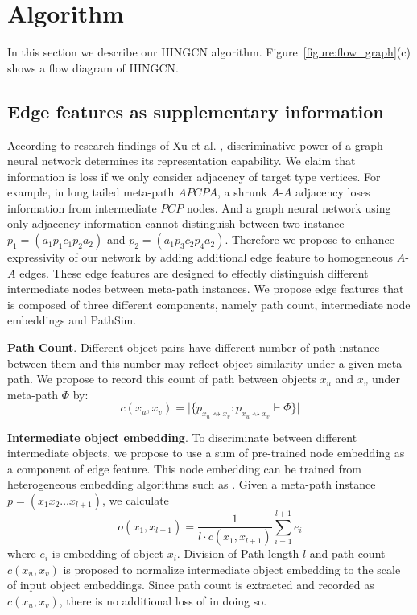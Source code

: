 \section{Algorithm}
\label{sec:algorithm}

In this section we describe our HINGCN algorithm. Figure~\ref{figure:flow_graph}(c) shows a flow diagram of HINGCN. 

\subsection{Edge features as supplementary information}
\label{sec:edge}
According to research findings of Xu et al. \cite{XuHLJ19}, discriminative power of a graph neural network determines its representation capability.
We claim that information is loss if we only consider adjacency of target type vertices. 
For example, in long tailed meta-path $APCPA$, a shrunk $A$-$A$ adjacency loses information from intermediate $PCP$ nodes. And a graph neural network using only adjacency information cannot distinguish between two instance $p_1 = (a_1 p_1 c_1 p_2 a_2)$ and $p_2 = (a_1 p_3 c_2 p_4 a_2)$. 
Therefore we propose to enhance expressivity of our network by adding additional edge feature to homogeneous $A$-$A$ edges. These edge features are designed to effectly distinguish different intermediate nodes between meta-path instances.
We propose edge features that is composed of three different components, namely path count, intermediate node embeddings and PathSim\citep{SunHYYW11}.

\noindent{\small$\bullet$}\textbf{Path Count}. Different object pairs have different number of path instance between them and this number may reflect object similarity under a given meta-path. We propose to record this count of path between objects $x_u$ and $x_v$ under meta-path $\Phi$ by: 
\begin{equation*}
c(x_u,x_v) = \vert\{ p_{x_u \rightsquigarrow x_v}:p_{x_u \rightsquigarrow x_v} \vdash \Phi \}\vert
\end{equation*}

\noindent{\small$\bullet$}\textbf{Intermediate object embedding}. 
To discriminate between different intermediate objects, we propose to use a sum of pre-trained node embedding as a component of edge feature. This node embedding can be trained from heterogeneous embedding algorithms such as \cite{GroverL16,DongCS17}.
Given a meta-path instance $p = (x_1x_2\ldots x_{l+1})$, we calculate
\begin{equation*}
o(x_1,x_{l+1}) = \dfrac{1}{l \cdot c(x_1,x_{l+1})} \sum\limits_{i=1}^{l+1} e_i
\end{equation*}
where $e_i$ is embedding of object $x_i$. Division of Path length $l$ and path count $c(x_u,x_v)$ is proposed to normalize intermediate object embedding to the scale of input object embeddings. Since path count is extracted and recorded as $c(x_u,x_v)$, there is no additional loss of in doing so.

